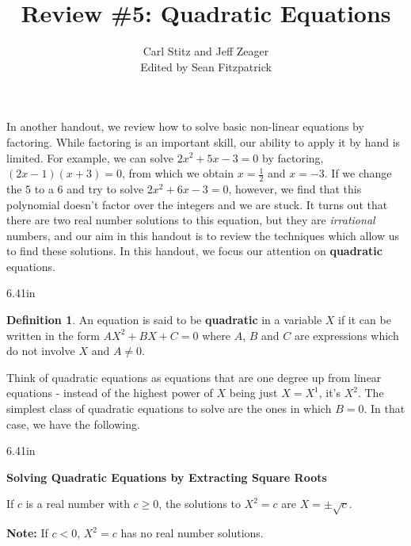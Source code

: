 \documentclass[11pt]{article}
\title{Review \#5: Quadratic Equations}
\author{Carl Stitz and Jeff Zeager\\
Edited by Sean Fitzpatrick}
\theoremstyle{definition}  %
\newtheorem{defn}{\bf Definition}
\newcommand{\bbm}{\begin{boxedminipage}{6.41in}}
\newcommand{\ebm}{\end{boxedminipage}}
\begin{document}
\maketitle


\renewcommand{\headrulewidth}{0pt}
\renewcommand{\headheight}{14pt}
\lhead[\fancyplain{}{\sc\thepage}]%
      {\fancyplain{}{\sc \nouppercase{\rightmark}}}
\rhead[\fancyplain{}{\sc \nouppercase{\leftmark}}]%
      {\fancyplain{}{\sc\thepage}}
\cfoot{}


In another handout, we review how to solve basic non-linear equations by factoring.  While factoring is an important skill, our ability to apply it by hand is limited. For example, we can solve $2x^2+5x-3=0$ by factoring, $(2x-1)(x+3) = 0$, from which we obtain $x = \frac{1}{2}$ and $x = -3$.  If we change the $5$ to a $6$ and try to solve $2x^2 + 6x - 3 = 0$, however, we find that this polynomial doesn't factor over the integers and we are stuck.  It turns out that there are two real number solutions to this equation, but they are \textit{irrational} numbers, and our aim in this handout is to review the techniques which allow us to find these solutions. In this handout, we focus our attention on \textbf{quadratic} equations.

\medskip

\colorbox{ResultColor}{\bbm

\begin{defn}\label{quadeqndefn} An equation is said to be \textbf{quadratic} in a variable $X$ if it can be written in the form $AX^2 + BX + C = 0$ where $A$, $B$ and $C$ are expressions which do not involve $X$ and $A \neq 0$.

\end{defn}

\ebm}

\medskip

Think of quadratic equations as equations that are one degree up from linear equations - instead of the highest power of $X$ being just $X = X^1$, it's $X^2$.  The simplest class of quadratic equations to solve are the ones in which $B = 0$.  In that case, we have the following.

\medskip

\label{extractingthesquareroot}

\colorbox{ResultColor}{\bbm

\centerline{\textbf{Solving Quadratic Equations by Extracting Square Roots}}
\vspace{.05in}
If $c$ is a real number with $c \geq 0$, the solutions to $X^2 = c$ are $X = \pm \sqrt{c}$.

\vspace{.05in}
\textbf{Note:}  If $c < 0$, $X^2 = c$ has no real number solutions.

\ebm}
\end{document}
